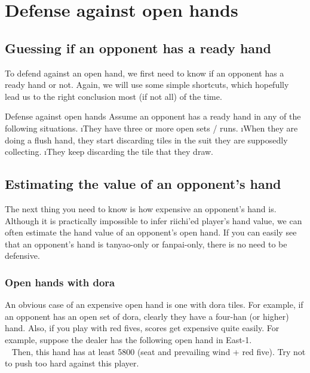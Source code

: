 {{\vfill

\section{Defense against open hands} \label{sec:defense_open}

\subsection{Guessing if an opponent has a ready hand}
To defend against an open hand, we first need to know if an opponent has a ready hand or not. Again, we will use some simple shortcuts, which hopefully lead us to the right conclusion most (if not all) of the time. 

\bigskip
\begin{itembox}[c]{Defense against open hands}
Assume an opponent has a ready hand in any of the following situations.
\be
\i They have three or more open sets / runs.
\i When they are doing a flush hand, they start discarding tiles in the suit they are supposedly collecting.
\i They keep discarding the tile that they draw.
\ee
\vsps
\end{itembox}
\bigskip

\subsection{Estimating the value of an opponent's hand}

The next thing you need to know is how expensive an opponent's hand is. Although it is practically impossible to infer riichi'ed player's hand value, we can often estimate the hand value of an opponent's open hand. If you can easily see that an opponent's hand is {\jap tanyao}-only or {\jap fanpai}-only, there is no need to be defensive.

\subsubsection*{Open hands with {\jap dora}}

An obvious case of an expensive open hand is one with {\jap dora} tiles. 
For example, if an opponent has an open set of {\jap dora}, clearly they have a four-{\jap han} (or higher) hand. Also, if you play with red fives, scores get expensive quite easily. For example, suppose the dealer has the following open hand in East-1.
\vspace{-20pt}
\bp
{}\\ \vspace{-16pt}
\rdong\dong\dong~\rfs{}
\ep
Then, this hand has at least 5800 (seat and prevailing wind + red five). Try not to push too hard against this player. 

}}
